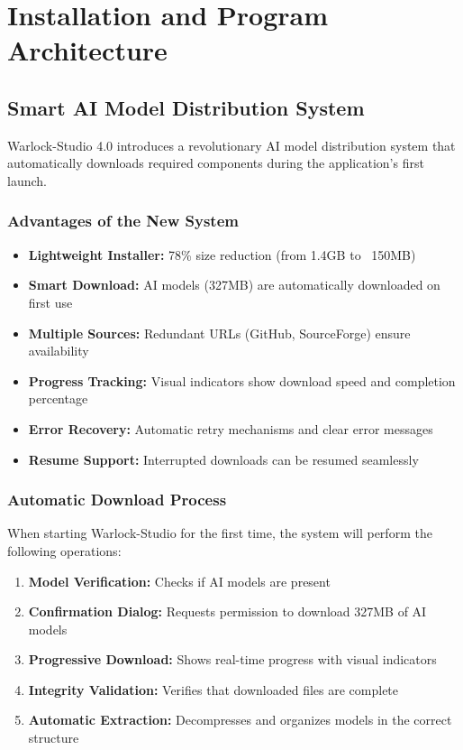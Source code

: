 \documentclass[11pt, a4paper]{article}
\begin{document}
\section{Installation and Program Architecture}

\subsection{Smart AI Model Distribution System}
\begin{infobox}
Warlock-Studio 4.0 introduces a revolutionary AI model distribution system that automatically downloads required components during the application's first launch.
\end{infobox}

\subsubsection{Advantages of the New System}
\begin{itemize}[leftmargin=*]
    \item \textbf{Lightweight Installer:} 78\% size reduction (from 1.4GB to ~150MB)
    \item \textbf{Smart Download:} AI models (327MB) are automatically downloaded on first use
    \item \textbf{Multiple Sources:} Redundant URLs (GitHub, SourceForge) ensure availability
    \item \textbf{Progress Tracking:} Visual indicators show download speed and completion percentage
    \item \textbf{Error Recovery:} Automatic retry mechanisms and clear error messages
    \item \textbf{Resume Support:} Interrupted downloads can be resumed seamlessly
\end{itemize}

\subsubsection{Automatic Download Process}
When starting Warlock-Studio for the first time, the system will perform the following operations:
\begin{enumerate}[leftmargin=*]
    \item \textbf{Model Verification:} Checks if AI models are present
    \item \textbf{Confirmation Dialog:} Requests permission to download 327MB of AI models
    \item \textbf{Progressive Download:} Shows real-time progress with visual indicators
    \item \textbf{Integrity Validation:} Verifies that downloaded files are complete
    \item \textbf{Automatic Extraction:} Decompresses and organizes models in the correct structure
\end{enumerate}
\end{document}
